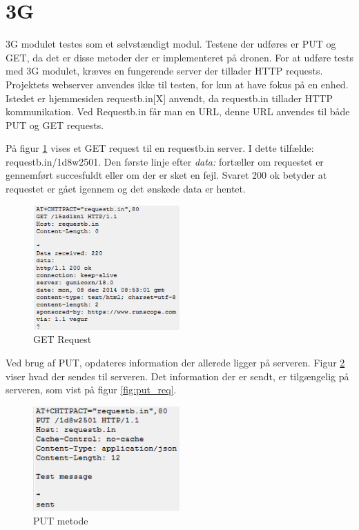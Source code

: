 \section{3G}

3G modulet testes som et selvstændigt modul. 
Testene der udføres er PUT og GET, da det er disse metoder der er implementeret på dronen. 
For at udføre tests med 3G modulet, kræves en fungerende server der tillader HTTP requests. Projektets webserver anvendes ikke til testen, for kun at have fokus på en enhed. Istedet er hjemmesiden requestb.in[X] anvendt, da requestb.in tillader HTTP kommunikation. Ved Requestb.in får man en URL, denne URL anvendes til både PUT og GET requests.

På figur \ref{fig:get_req} vises et GET request til en requestb.in server. I dette tilfælde: requestb.in/1d8w2501. Den første linje efter \textit{data:} fortæller om requestet er gennemført succesfuldt eller om der er sket en fejl. Svaret 200 ok betyder at requestet er gået igennem og det ønskede data er hentet. 

\begin{figure}[H]
\centering
\includegraphics[width=0.5\textwidth]{Billeder/Test/get_requestbin.png}
\caption{GET Request}
\label{fig:get_req}
\end{figure}

Ved brug af PUT, opdateres information der allerede ligger på serveren. Figur \ref{fig:putrequest_module} viser hvad der sendes til serveren. Det information der er sendt, er tilgængelig på serveren, som vist på figur \ref{fig:put_req}.

\begin{figure}[H]
\centering
\includegraphics[width=0.5\textwidth]{Billeder/Test/putrequest_module.png}
\caption{PUT metode}
\label{fig:putrequest_module}
\end{figure}

